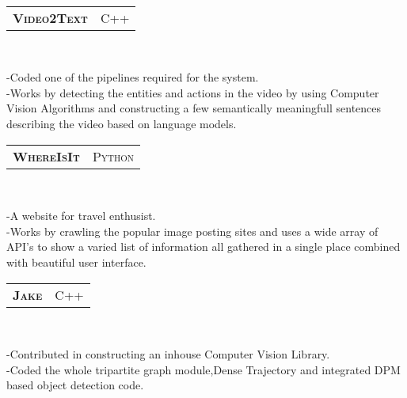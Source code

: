 \documentclass[10pt,a4paper,oneside]{article}
\begin{document}
\begin{minipage}[t]{0.63\textwidth}
        \vspace{10pt}\\
        \begin{tabular}{c|c}
            \textbf{\normalsize V\textsc{ideo}2T\textsc{ext}}
            &\textmd{\normalsize C\textsc{++}}
        \end{tabular}\\
         \vspace{-4mm}
        \begin{adjustwidth}{7pt}{0pt}
        {\footnotesize -Coded one of the pipelines required
        for the system.\\
        -Works by detecting the entities and actions in the
        video by using Computer Vision Algorithms and constructing a few
        semantically meaningfull sentences describing the video
        based on language models.}\\
        \end{adjustwidth}
        \begin{tabular}{c|c}
            \textbf{\normalsize W\textsc{here}I\textsc{s}I\textsc{t}}
            &\textmd{\normalsize P\textsc{ython}}
        \end{tabular}\\
         \vspace{-4mm}
        \begin{adjustwidth}{7pt}{0pt}
        {\footnotesize -A website for travel
        enthusist.\\
        -Works by crawling the popular image posting sites and
        uses a wide array of API's to show a varied list of
        information all gathered in a single place combined with
        beautiful user interface. }\\
        \end{adjustwidth}
        \begin{tabular}{c|c}
            \textbf{\normalsize J\textsc{ake}}
            &\textmd{\normalsize C\textsc{++}}
        \end{tabular}\\
         \vspace{-4mm}
        \begin{adjustwidth}{7pt}{0pt}
        {\footnotesize -Contributed in constructing an inhouse
        Computer Vision Library.\\
        -Coded the whole tripartite graph module,Dense
    Trajectory and integrated DPM based object detection code.}\\
        \end{adjustwidth}

\end{minipage}
\end{document}
